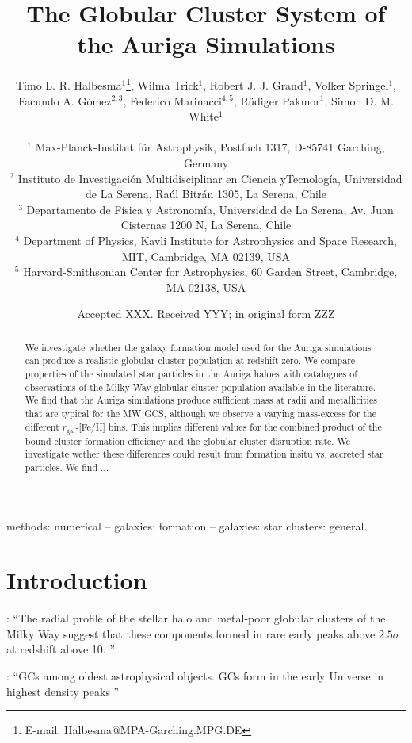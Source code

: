 \documentclass[a4paper,fleqn,usenatbib]{mnras}
\title[Auriga GCS]{The Globular Cluster System of the Auriga Simulations}
\author[T. L. R. Halbesma et al.]{\parbox[t]{\textwidth}{
    Timo L. R. Halbesma$^{1}$\thanks{E-mail: Halbesma@MPA-Garching.MPG.DE},
    Wilma Trick$^{1}$,
    Robert J. J. Grand$^{1}$, 
    Volker Springel$^{1}$, 
    Facundo A. G\'{o}mez$^{2,3}$, 
    Federico Marinacci$^{4,5}$,
    R\"{u}diger Pakmor$^{1}$, 
    Simon D. M. White$^{1}$
} \vspace{10pt} \\
$^{1}$ Max-Planck-Institut f\"ur Astrophysik, Postfach 1317, D-85741 Garching, Germany \\
$^{2}$ Instituto de Investigaci\'{o}n Multidisciplinar en Ciencia yTecnolog\'{i}a, 
    Universidad de La Serena, Ra\'{u}l Bitr\'{a}n 1305, La Serena, Chile \\
$^{3}$ Departamento de F\'{i}sica y Astronom\'{i}a, Universidad de La Serena, Av.
    Juan Cisternas 1200 N, La Serena, Chile \\
$^{4}$ Department of Physics, Kavli Institute for Astrophysics and Space Research,
    MIT, Cambridge, MA 02139, USA \\
$^{5}$ Harvard-Smithsonian Center for Astrophysics, 60 Garden Street, Cambridge,
    MA 02138, USA \\
}
\date{Accepted XXX. Received YYY; in original form ZZZ}
\begin{document}
\label{firstpage}
\pagerange{\pageref{firstpage}--\pageref{lastpage}}
\maketitle

\begin{abstract}
We investigate whether the galaxy formation model used for the Auriga simulations 
can produce a realistic globular cluster population at redshift zero. We compare
properties of the simulated star particles in the Auriga haloes with
catalogues of observations of the Milky Way globular cluster population available
in the literature. We find that the Auriga simulations produce sufficient mass
at radii and metallicities that are typical for the MW GCS, although we observe
a varying mass-excess for the different $r_{\text{gal}}$-[Fe/H] bins. This implies
different values for the combined product of the bound cluster formation efficiency
and the globular cluster disruption rate. We investigate wether these differences
could result from formation insitu vs. accreted star particles. We find ...
\end{abstract}

\begin{keywords}
methods: numerical -- galaxies: formation -- galaxies: star clusters: general.
\end{keywords}



\section{Introduction}

\citet{2005MNRAS.364..367D}: ``The radial profile of the stellar halo and metal-poor globular
clusters of the Milky Way suggest that these components formed in rare early peaks above $2.5 \sigma$ at redshift above 10. ''

\citet{2017MNRAS.465.3622R}: ``GCs among oldest astrophysical objects. GCs form in the early Universe in highest density peaks \citep[e.g.][]{2005MNRAS.364..367D, 2009ApJ...706L.192B}''
\end{document}
